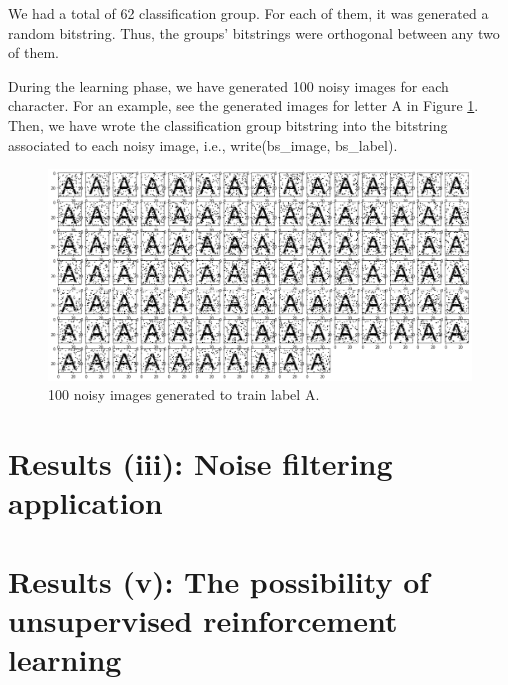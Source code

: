 We had a total of 62 classification group. For each of them, it was generated a random bitstring. Thus, the groups' bitstrings were orthogonal between any two of them.

During the learning phase, we have generated 100 noisy images for each character. For an example, see the generated images for letter A in Figure \ref{fig-classification-training-A}. Then, we have wrote the classification group bitstring into the bitstring associated to each noisy image, i.e., write(bs\_image, bs\_label).

\begin{figure}[h]
\centering\includegraphics[width=\textwidth]{./images02/classification/trainingA.png}
\caption{100 noisy images generated to train label A.
\label{fig-classification-training-A}}
\end{figure}


\section{Results (iii): Noise filtering application}

\section{Results (v): The possibility of unsupervised reinforcement learning}

